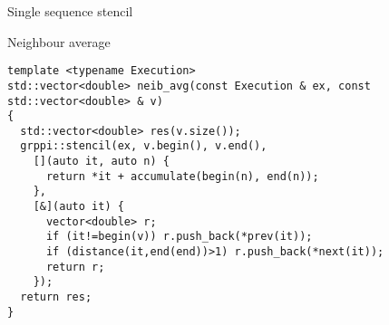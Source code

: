 \begin{frame}[t,fragile]{Single sequence stencil}
\begin{block}{Neighbour average}
\begin{lstlisting}
template <typename Execution>
std::vector<double> neib_avg(const Execution & ex, const std::vector<double> & v)
{
  std::vector<double> res(v.size());
  grppi::stencil(ex, v.begin(), v.end(), 
    [](auto it, auto n) {
      return *it + accumulate(begin(n), end(n)); 
    },
    [&](auto it) {
      vector<double> r;
      if (it!=begin(v)) r.push_back(*prev(it));
      if (distance(it,end(end))>1) r.push_back(*next(it));
      return r;
    });
  return res;
}
\end{lstlisting}
\end{block}
\end{frame}

